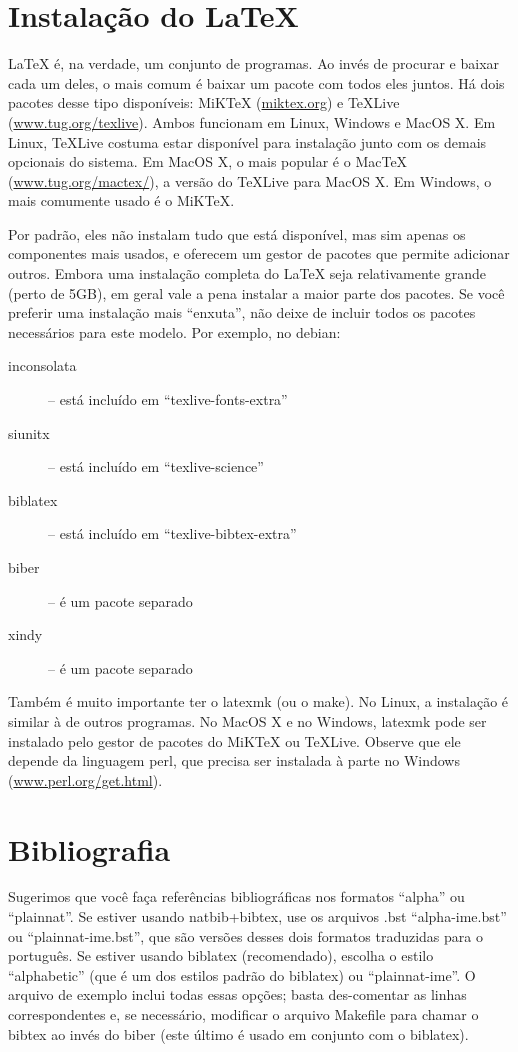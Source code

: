 \section{Instalação do \LaTeX{}}

\LaTeX{} é, na verdade, um conjunto de programas. Ao invés de procurar e
baixar cada um deles, o mais comum é baixar um pacote com todos eles juntos.
Há dois pacotes desse tipo disponíveis: MiK\TeX{} (\url{miktex.org}) e
\TeX{}Live (\url{www.tug.org/texlive}). Ambos funcionam em Linux, Windows e
MacOS X. Em Linux, \TeX{}Live costuma estar disponível para instalação junto
com os demais opcionais do sistema. Em MacOS X, o mais popular é o Mac\TeX{}
(\url{www.tug.org/mactex/}), a versão do \TeX{}Live para MacOS X.  Em Windows,
o mais comumente usado é o MiK\TeX{}.

Por padrão, eles não instalam tudo que está disponível, mas sim apenas os
componentes mais usados, e oferecem um gestor de pacotes que permite adicionar
outros. Embora uma instalação completa do \LaTeX{} seja relativamente grande
(perto de 5GB), em geral vale a pena instalar a maior parte dos pacotes. Se
você preferir uma instalação mais ``enxuta'', não deixe de incluir todos os
pacotes necessários para este modelo. Por exemplo, no debian:

\begin{description}
  \item [inconsolata] -- está incluído em ``texlive-fonts-extra''
  \item [siunitx] -- está incluído em ``texlive-science''
  \item [biblatex] -- está incluído em ``texlive-bibtex-extra''
  \item [biber] -- é um pacote separado
  \item [xindy] -- é um pacote separado
\end{description}

Também é muito importante ter o \textsf{latexmk} (ou o \textsf{make}). No Linux,
a instalação é similar à de outros programas. No MacOS X e no Windows,
\textsf{latexmk} pode ser instalado pelo gestor de pacotes do MiK\TeX{} ou
\TeX{}Live. Observe que ele depende da linguagem \textsf{perl}, que precisa ser
instalada à parte no Windows (\url{www.perl.org/get.html}).

\section{Bibliografia}

Sugerimos que você faça referências bibliográficas nos formatos ``alpha'' ou
``plainnat''.  Se estiver usando natbib+bibtex,
use os arquivos .bst ``alpha-ime.bst'' ou ``plainnat-ime.bst'', que são
versões desses dois formatos traduzidas para o português. Se estiver usando
biblatex (recomendado), escolha o estilo ``alphabetic''
(que é um dos estilos padrão do biblatex) ou ``plainnat-ime''. O arquivo de
exemplo inclui todas essas opções; basta des-comentar as linhas
correspondentes e, se necessário, modificar o arquivo Makefile para chamar
o bibtex ao invés do biber (este último é usado
em conjunto com o biblatex).


